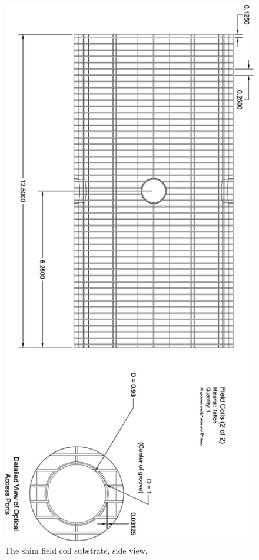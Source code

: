 \documentclass[../PaulGanssle-Thesis.tex]{subfiles}
\begin{document}
\begin{figure}[p]
\centering
\includegraphics[height=0.95\textheight]{appendices/blueprints/ShimCoils02-Side.png}
\caption{The shim field coil substrate, side view.}
\label{blueprints:FieldCoils-Side}
\end{figure}
\end{document}
